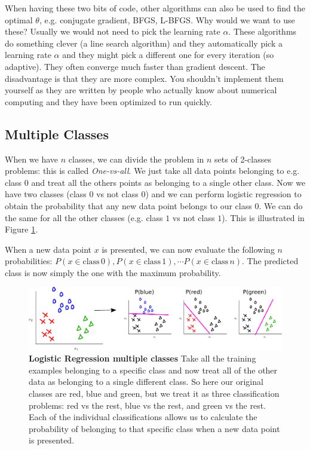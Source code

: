 \documentclass[a4paper, 10pt,hidelinks]{article}
\begin{document}
When having these two bits of code, other algorithms can also be used to find the optimal $\theta$, e.g. conjugate gradient, BFGS, L-BFGS. Why would we want to use these? Usually we would not need to pick the learning rate $\alpha$. These algorithms do something clever (a line search algorithm) and they automatically pick a learning rate $\alpha$ and they might pick a different one for every iteration (so adaptive). They often converge much faster than gradient descent. The disadvantage is that they are more complex. You shouldn't implement them yourself as they are written by people who actually know about numerical computing and they have been optimized to run quickly. 



\subsection{Multiple Classes}

When we have $n$ classes, we can divide the problem in $n$ sets of 2-classes problems: this is called \emph{One-vs-all}. We just take all data points belonging to e.g. class $0$ and treat all the others points as belonging to a single other class. Now we have two classes (class $0$ vs not class $0$) and we can perform logistic regression to obtain the probability that any new data point belongs to our class $0$. We can do the same for all the other classes (e.g. class $1$ vs not class $1$). This is illustrated in Figure \ref{Fig: Multiple Classes}.

 When a new data point $x$ is presented, we can now evaluate the following $n$ probabilities: $P(x \in \text{class}\, 0), P(x \in \text{class}\, 1), \cdots P(x \in \text{class}\, n)$. The predicted class is now simply the one with the maximum probability. 


\begin{figure}[h!]
\includegraphics[width=0.9\linewidth]{MultipleClasses}
\caption{\footnotesize{\textbf{Logistic Regression multiple classes} Take all the training examples belonging to a specific class and now treat all of the other data as belonging to a single different class. So here our original classes are red, blue and green, but we treat it as three classification problems: red vs the rest, blue vs the rest, and green vs the rest. Each of the individual classifications allows us to calculate the probability of belonging to that specific class when a new data point is presented. }}
\label{Fig: Multiple Classes}
\end{figure}
\end{document}
